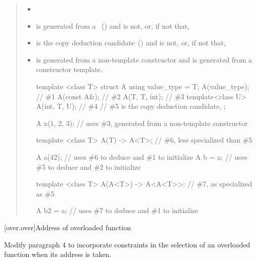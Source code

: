 \begin{quote}
\begin{itemize}
\item
{}

\item
{} is generated from a
~()
and  is not, or, if not that,

\item
{} is the copy deduction candidate~()
and  is not, or, if not that,

\item
{} is generated from a non-template constructor
and  is generated from a constructor template.
\enterexample
\begin{codeblock}
template <class T> struct A {
  using value_type = T;
  A(value_type);    // \#1
  A(const A&);      // \#2
  A(T, T, int);     // \#3
  template<class U>
    A(int, T, U);   // \#4
  // \#5 is the copy deduction candidate, 
};

A x(1, 2, 3);       // uses \#3, generated from a non-template constructor

template <class T>
A(T) -> A<T>;       // \#6, less specialized than \#5

A a(42);            // uses \#6 to deduce  and \#1 to initialize
A b = a;            // uses \#5 to deduce  and \#2 to initialize

template <class T>
A(A<T>) -> A<A<T>>; // \#7, as specialized as \#5

A b2 = a;           // uses \#7 to deduce  and \#1 to initialize
\end{codeblock}
\exitexample
\end{itemize}
\end{quote}



[over.over]{Address of overloaded function}

Modify paragraph 4 to incorporate constraints in the selection of an 
overloaded function when its address is taken.

